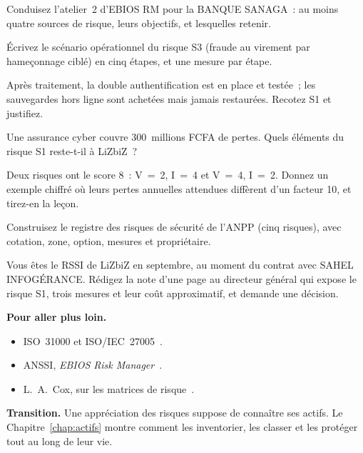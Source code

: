 \begin{boxexo}[title={\ding{45}\quad Exercice~7.4. Atelier 2 \niveaumoyen}]
Conduisez l'atelier~2 d'EBIOS RM pour la BANQUE SANAGA~: au moins quatre
sources de risque, leurs objectifs, et lesquelles retenir.
\end{boxexo}

\begin{boxexo}[title={\ding{45}\quad Exercice~7.5. Scénario opérationnel \niveaumoyen}]
Écrivez le scénario opérationnel du risque S3 (fraude au virement par
hameçonnage ciblé) en cinq étapes, et une mesure par étape.
\end{boxexo}

\begin{boxexo}[title={\ding{45}\quad Exercice~7.6. Risque résiduel \niveaumoyen}]
Après traitement, la double authentification est en place et testée~;
les sauvegardes hors ligne sont achetées mais jamais restaurées. Recotez
S1 et justifiez.
\end{boxexo}

\begin{boxexo}[title={\ding{45}\quad Exercice~7.7. Transférer \niveaumoyen}]
Une assurance cyber couvre 300~millions FCFA de pertes. Quels éléments du
risque S1 reste-t-il à LiZbiZ~?
\end{boxexo}

\begin{boxexo}[title={\ding{45}\quad Exercice~7.8. Les limites \niveaumoyen}]
Deux risques ont le score 8~: V~=~2, I~=~4 et V~=~4, I~=~2. Donnez un
exemple chiffré où leurs pertes annuelles attendues diffèrent d'un
facteur 10, et tirez-en la leçon.
\end{boxexo}

\begin{boxexo}[title={\ding{45}\quad Exercice~7.9. Le registre \niveauexpert}]
Construisez le registre des risques de sécurité de l'ANPP (cinq risques),
avec cotation, zone, option, mesures et propriétaire.
\end{boxexo}

\begin{boxexo}[title={\ding{45}\quad Exercice~7.10. Septembre \niveauexpert}]
Vous êtes le RSSI de LiZbiZ en septembre, au moment du contrat avec SAHEL
INFOGÉRANCE. Rédigez la note d'une page au directeur général qui expose
le risque S1, trois mesures et leur coût approximatif, et demande une
décision.
\end{boxexo}

\bigskip

\begin{boxinfo}
\textbf{Pour aller plus loin.}
\begin{itemize}
    \item ISO~31000 et ISO/IEC~27005~\cite{iso31000_2018,iso27005_2022}.
    \item ANSSI, \emph{EBIOS Risk Manager}~\cite{anssi2018ebios}.
    \item L.~A.~Cox, sur les matrices de risque~\cite{cox2008matrices}.
\end{itemize}
\end{boxinfo}

\begin{boxinfo}
\textbf{Transition.} Une appréciation des risques suppose de connaître
ses actifs. Le Chapitre~\ref{chap:actifs} montre comment les
inventorier, les classer et les protéger tout au long de leur vie.
\end{boxinfo}
